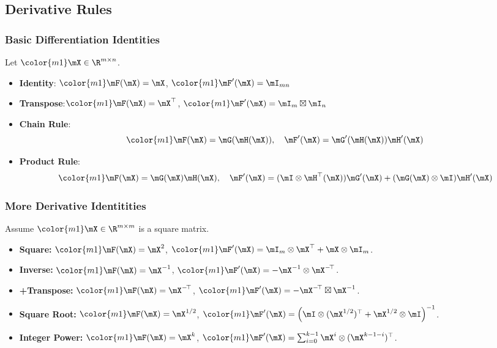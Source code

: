 \subsection{Derivative Rules}
\begin{frame}
\frametitle{Basic Differentiation Identities}
Let $\color{m1}\mX\in\R^{m\times n}$.
\begin{itemize}
\item \textbf{Identity}: $\color{m1}\mF(\mX)=\mX$, $\color{m1}\mF'(\mX)=\mI_{mn}$
\item \textbf{Transpose}:$\color{m1}\mF(\mX)=\mX^\top$, $\color{m1}\mF'(\mX)=\mI_{m}\boxtimes\mI_n$
\item \textbf{Chain Rule}: 
$$\color{m1}\mF(\mX)=\mG(\mH(\mX)),\quad\mF'(\mX)=\mG'(\mH(\mX))\mH'(\mX)$$
\item \textbf{Product Rule}: 
$$\color{m1}\mF(\mX)=\mG(\mX)\mH(\mX),\quad\mF'(\mX)=(\mI\otimes\mH^\top(\mX))\mG'(\mX)+(\mG(\mX)\otimes\mI)\mH'(\mX)$$
\end{itemize}
\end{frame}
\begin{frame}
\frametitle{More Derivative Identitities}
Assume $\color{m1}\mX\in\R^{m\times m}$ is a square matrix.
\begin{itemize}
\item \textbf{Square:}
$\color{m1}\mF(\mX)=\mX^2$, $\color{m1}\mF'(\mX)=\mI_m\otimes\mX^\top+\mX\otimes\mI_m$.
\item \textbf{Inverse:} $\color{m1}\mF(\mX)=\mX^{-1}$, $\color{m1}\mF'(\mX)=-\mX^{-1}\otimes\mX^{-\!\top}$.
\item \textbf{+Transpose:} $\color{m1}\mF(\mX)=\mX^{-\!\top}$, $\color{m1}\mF'(\mX)=-\mX^{-\!\top}\boxtimes\mX^{-1}$.
\item \textbf{Square Root:} $\color{m1}\mF(\mX)=\mX^{1/2}$,
  $\color{m1}\mF'(\mX)=\left(\mI\otimes(\mX^{1/2})^\top+ \mX^{1/2}\otimes\mI \right)^{-1}$.
\item \textbf{Integer Power:} $\color{m1}\mF(\mX)=\mX^k$,
  $\color{m1}\mF'(\mX)=\sum_{i=0}^{k-1}\mX^i\otimes(\mX^{k-1-i})^{\top}$.
\end{itemize}
\end{frame}

